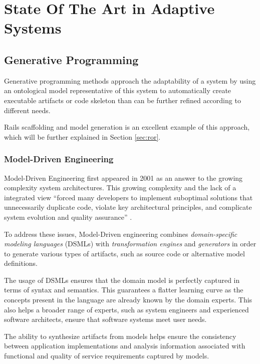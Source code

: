 \chapter{State Of The Art in Adaptive Systems}\label{chap:sota}

\section{Generative Programming}\label{sec:generative_programming}

Generative programming methods approach the adaptability of a system by using an ontological model representative of this system to automatically create executable artifacts or code skeleton than can be further refined according to different needs.

Rails scaffolding and model generation is an excellent example of this approach, which will be further explained in Section \ref{sec:ror}.

\subsection{Model-Driven Engineering}\label{sec:mda}

Model-Driven Engineering first appeared in 2001 \cite{Mil03} as an answer to the growing complexity system architectures. This growing complexity and the lack of a integrated view ``forced many developers to implement suboptimal solutions that unnecessarily duplicate code, violate key architectural principles, and complicate system evolution and quality assurance'' \cite{Sch06}.

To address these issues, Model-Driven engineering combines \textit{domain-specific modeling languages} (DSMLs) with \textit{transformation engines} and \textit{generators} in order to generate various types of artifacts, such as source code or alternative model definitions.

The usage of DSMLs ensures that the domain model is perfectly captured in terms of syntax and semantics. This guarantees a flatter learning curve as the concepts present in the language are already known by the domain experts. This also helps a broader range of experts, such as system engineers and experienced software architects, ensure that software systems meet user needs.

The ability to synthesize artifacts from models helps ensure the consistency between application implementations and analysis information associated with functional and quality of service requirements captured by models.

